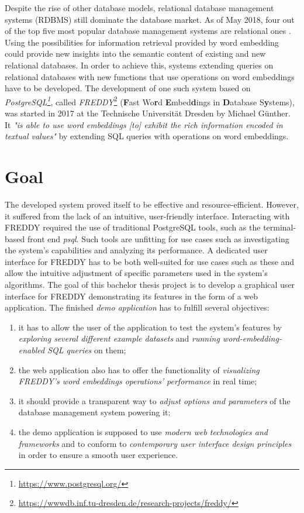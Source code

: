 Despite the rise of other database models, relational database management systems (RDBMS) still dominate the database market. As of May 2018, four out of the top five most popular database management systems are relational ones \cite{db-engines}. Using the possibilities for information retrieval provided by word embedding could provide new insights into the semantic content of existing and new relational databases. In order to achieve this, systems extending queries on relational databases with new functions that use operations on word embeddings have to be developed. The development of one such system based on \textit{PostgreSQL\footnote{\url{https://www.postgresql.org/}}}, called \textit{FREDDY}\footnote{\url{https://wwwdb.inf.tu-dresden.de/research-projects/freddy/}} (\textbf{F}ast Wo\textbf{r}d \textbf{E}mbed\textbf{d}ings in \textbf{D}atabase S\textbf{y}stems), was started in 2017 at the Technische Universität Dresden by Michael Günther. It \textit{"is able to use word embeddings [to] exhibit the rich information encoded in textual values"} \cite{freddy-github} by extending SQL queries with operations on word embeddings.

\section{Goal}
The developed system proved itself to be effective and resource-efficient. However, it suffered from the lack of an intuitive, user-friendly interface. Interacting with FREDDY required the use of traditional PostgreSQL tools, such as the terminal-based front end \textit{psql}. Such tools are unfitting for  use cases such as investigating the system's capabilities and analyzing its performance. A dedicated user interface for FREDDY has to be both well-suited for use cases such as these and allow the intuitive adjustment of specific parameters used in the system's algorithms. The goal of this bachelor thesis project is to develop a graphical user interface for FREDDY demonstrating its features in the form of a web application. The finished \textit{demo application} has to fulfill several objectives:
\begin{enumerate}
	\item it has to allow the user of the application to test the system's features by \textit{exploring several different example datasets} and \textit{running word-embedding-enabled SQL queries} on them;
	\item the web application also has to offer the functionality of \textit{visualizing FREDDY's word embeddings operations' performance} in real time;
	\item it should provide a transparent way to \textit{adjust options and parameters} of the database management system powering it;
	\item the demo application is supposed to use \textit{modern web technologies and frameworks} and to conform to \textit{contemporary user interface design principles} in order to ensure a smooth user experience.
\end{enumerate}

